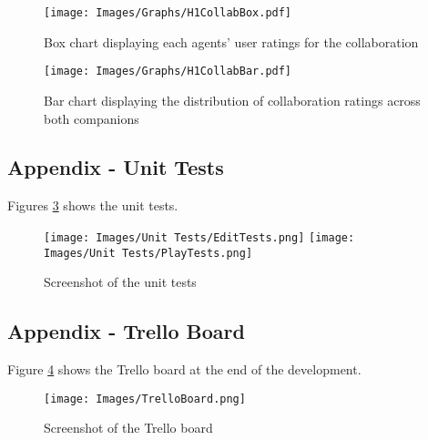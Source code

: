 \documentclass{IEEEtran}
\begin{document}
\label{AppendixGraphs}

\begin{figure}[h!]
  \centering
  \texttt{[image: Images/Graphs/H1CollabBox.pdf]}
  
\caption{Box chart displaying each agents' user ratings for the collaboration}
\label{fig:AppendixH1CollabBox}
\end{figure}

\begin{figure}[h!]
  \centering
  \texttt{[image: Images/Graphs/H1CollabBar.pdf]}
  
\caption{Bar chart displaying the distribution of collaboration ratings across both companions}
\label{fig:AppendixH1CollabBar}
\end{figure}

\newpage

\subsection{Appendix - Unit Tests}
\label{AppendixUnitTests}

Figures \ref{fig:AppendixUnitTests} shows the unit tests.

\begin{figure}[!h]
  \centering
  \texttt{[image: Images/Unit Tests/EditTests.png]}
  \texttt{[image: Images/Unit Tests/PlayTests.png]}
  
\caption{Screenshot of the unit tests}
\label{fig:AppendixUnitTests}
\end{figure}

\newpage

\subsection{Appendix - Trello Board}
\label{AppendixTrelloBoard}

Figure \ref{fig:AppendixTrelloBoard} shows the Trello board at the end of the development.

\begin{figure}
  \centering
  \texttt{[image: Images/TrelloBoard.png]}
  
\caption{Screenshot of the Trello board}
\label{fig:AppendixTrelloBoard}
\end{figure}
\end{document}
